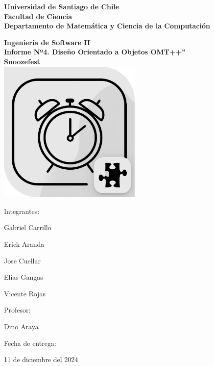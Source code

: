 \begin{titlepage}

\begin{center}
	{\bf Universidad de Santiago de Chile}
	\\
    {\bf Facultad de Ciencia}
	\\
    {\bf Departamento de Matem\'atica y Ciencia de la Computaci\'on}
\end{center}

%

\vfill
\begin{center}
{\large\bf Ingeniería de Software II}
\\
{\Large\bf Informe Nº4. Diseño Orientado a Objetos OMT++”}\\
\vspace{1cm}
{\Huge\bf Snoozefest}\\
\vspace{2cm}
\includegraphics[height=200pt,width=200pt]{./logo.png}
\end{center}
\vfill

%

\begin{flushright}
	\begin{minipage}{0.3\textwidth}
		Integrantes:
		\begin{simplelist}
			\item Gabriel Carrillo
			\item Erick Aranda
			\item Jose Cuellar
			\item Elías Gangas
			\item Vicente Rojas
		\end{simplelist}
	

		Profesor:
		\begin{simplelist}
			\item Dino Araya
		\end{simplelist}
	
		Fecha de entrega:
		\begin{simplelist}
			\item 11 de diciembre del 2024
		\end{simplelist}
	\end{minipage}
\end{flushright}

\end{titlepage}
